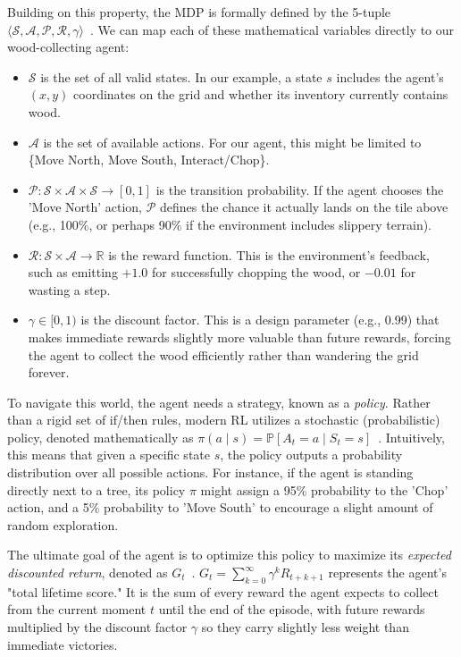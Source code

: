 Building on this property, the MDP is formally defined by the 5-tuple $\langle \mathcal{S}, \mathcal{A}, \mathcal{P}, \mathcal{R}, \gamma \rangle$~\parencite{Szepesvári_2011}.
We can map each of these mathematical variables directly to our wood-collecting agent:
\begin{itemize}
    \item $\mathcal{S}$ is the set of all valid states. In our example, a state $s$ includes the agent's $(x, y)$ coordinates on the grid and whether its inventory currently contains wood.
    \item $\mathcal{A}$ is the set of available actions. For our agent, this might be limited to \{Move North, Move South, Interact/Chop\}.
    \item $\mathcal{P}: \mathcal{S} \times \mathcal{A} \times \mathcal{S} \rightarrow [0, 1]$ is the transition probability. If the agent chooses the 'Move North' action, $\mathcal{P}$ defines the chance it actually lands on the tile above (e.g., 100\%, or perhaps 90\% if the environment includes slippery terrain).
    \item $\mathcal{R}: \mathcal{S} \times \mathcal{A} \rightarrow \mathbb{R}$ is the reward function. This is the environment's feedback, such as emitting $+1.0$ for successfully chopping the wood, or $-0.01$ for wasting a step.
    \item $\gamma \in [0, 1)$ is the discount factor. This is a design parameter (e.g., 0.99) that makes immediate rewards slightly more valuable than future rewards, forcing the agent to collect the wood efficiently rather than wandering the grid forever.
\end{itemize}

To navigate this world, the agent needs a strategy, known as a \emph{policy}. Rather than a rigid set of if/then rules, modern RL utilizes a stochastic (probabilistic) policy, denoted mathematically as $\pi(a \mid s) = \mathbb{P}[A_t = a \mid S_t = s]$~\parencite{Sutton_Barto_2018}.
Intuitively, this means that given a specific state $s$, the policy outputs a probability distribution over all possible actions. For instance, if the agent is standing directly next to a tree, its policy $\pi$ might assign a 95\% probability to the 'Chop' action, and a 5\% probability to 'Move South' to encourage a slight amount of random exploration.

The ultimate goal of the agent is to optimize this policy to maximize its \emph{expected discounted return}, denoted as $G_t$~\parencite{Sutton_Barto_2018}.
$G_t = \sum_{k=0}^{\infty} \gamma^k R_{t+k+1}$ represents the agent's "total lifetime score."
It is the sum of every reward the agent expects to collect from the current moment $t$ until the end of the episode, with future rewards multiplied by the discount factor $\gamma$ so they carry slightly less weight than immediate victories.

